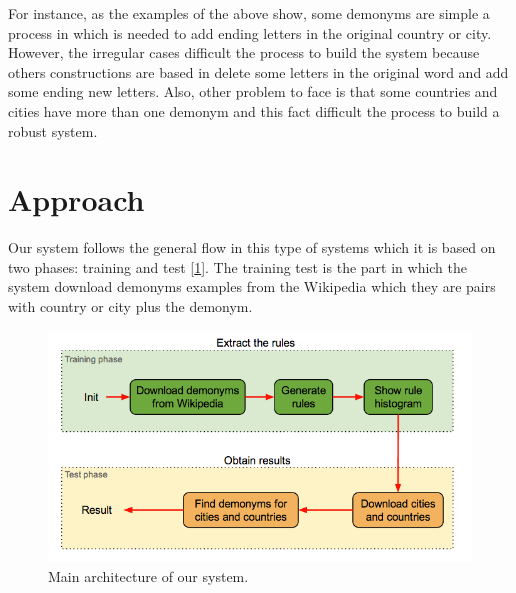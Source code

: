 \documentclass[]{report}
\begin{document}
For instance, as the examples of the above show, some demonyms are simple a process in which is needed to add ending letters in the original country or city. However, the irregular cases difficult the process to build the system because others constructions are based in delete some letters in the original word and add some ending new letters. Also, other problem to face is that some countries and cities have more than one demonym and this fact difficult the process to build a robust system. 

\newpage
\section{Approach}



Our system follows the general flow in this type of systems which it is based on two phases: training and test [\ref{Main architecture of our system.}]. The training test is the part in which the system download demonyms examples from the Wikipedia which they are pairs with country or city plus the demonym. 

\begin{figure}[htb!]
\centering
\includegraphics[scale=0.5]{img/architecture}
\caption{Main architecture of our system.}
\label{Main architecture of our system.}
\end{figure}
\end{document}
